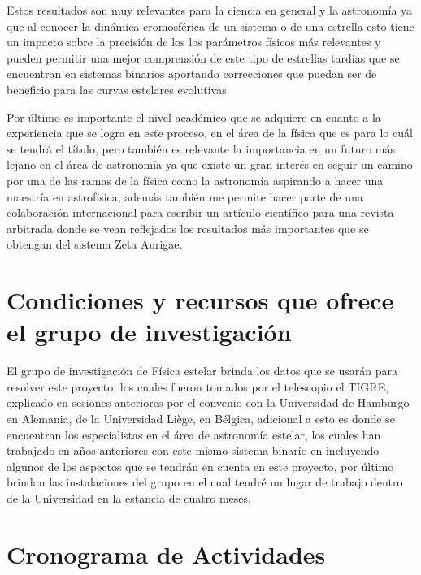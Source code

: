 \documentclass[11pt]{article}
\begin{document}
\noindent Estos resultados son muy relevantes para la ciencia en general y la astronomía ya que al conocer la dinámica cromosférica de un sistema o de una estrella esto tiene un impacto sobre la precisión de los los parámetros físicos más relevantes y pueden permitir una mejor comprensión de este tipo de estrellas tardías que se encuentran en sistemas binarios aportando correcciones que puedan ser de beneficio para las curvas estelares evolutivas  

Por último es importante el nivel académico que se adquiere en cuanto a la experiencia que se logra en este proceso, en el área de la física que es para lo cuál se tendrá el título, pero también es relevante la importancia en un futuro más lejano en el área de astronomía ya que existe un gran  interés en seguir un camino por una de las ramas de la física como la astronomía aspirando a hacer una maestría en astrofísica, además también me permite hacer parte de una colaboración internacional para escribir un artículo científico para una revista arbitrada donde se vean reflejados los resultados más importantes que se obtengan del sistema Zeta Aurigae.




\section{Condiciones y recursos que ofrece el grupo de investigación}
El grupo de investigación de Física estelar brinda los datos que se usarán para resolver este proyecto, los cuales fueron tomados por el telescopio el TIGRE, explicado en sesiones anteriores por el convenio con la Universidad de Hamburgo en Alemania, de la Universidad Liège, en Bélgica, adicional a esto es donde se encuentran los especialistas en el área de astronomía estelar, los cuales han trabajado en años anteriores con este mismo sistema binario en incluyendo algunos de los aspectos que se tendrán en cuenta en este proyecto, por último brindan las instalaciones del grupo en el cual tendré un lugar de trabajo dentro de la Universidad en la estancia de cuatro meses.
\section{Cronograma de Actividades}	
\end{document}

